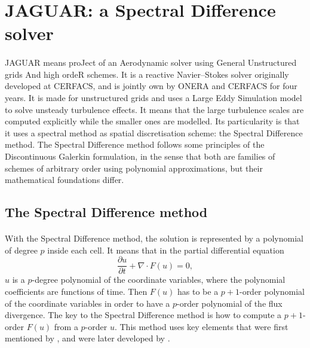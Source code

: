   \section{JAGUAR: a Spectral Difference solver}

    \paragraph{}
    JAGUAR means proJect of an Aerodynamic solver using General Unstructured grids And high ordeR schemes.
    It is a reactive Navier--Stokes solver originally developed at CERFACS, and is jointly own by ONERA and CERFACS for four years.
    It is made for unstructured grids and uses a Large Eddy Simulation model to solve unsteady turbulence effects.
    It means that the large turbulence scales are computed explicitly while the smaller ones are modelled.
    Its particularity is that it uses a spectral method as spatial discretisation scheme: the Spectral Difference method.
    The Spectral Difference method follows some principles of the Discontinuous Galerkin formulation, in the sense that both are families of schemes of arbitrary order using polynomial approximations, but their mathematical foundations differ.


    \subsection{The Spectral Difference method}

      \paragraph{}
      With the Spectral Difference method, the solution is represented by a polynomial of degree $p$ inside each cell.
      It means that in the partial differential equation
      \begin{equation}\label{eq:pde_2}
        \frac{\partial u}{\partial t} + \nabla \cdot F\left(u\right) = 0 ,
      \end{equation}
      $u$ is a $p$-degree polynomial of the coordinate variables, where the polynomial coefficients are functions of time.
      Then $F\left(u\right)$ has to be a $p\!+\!1$-order polynomial of the coordinate variables in order to have a $p$-order polynomial of the flux divergence.
      The key to the Spectral Difference method is how to compute a $p + 1$-order $F\left(u\right)$ from a $p$-order $u$.
      This method uses key elements that were first mentioned by \cite{Kopriva1996}, and were later developed by \cite{LiuVinokurWang2006}.


